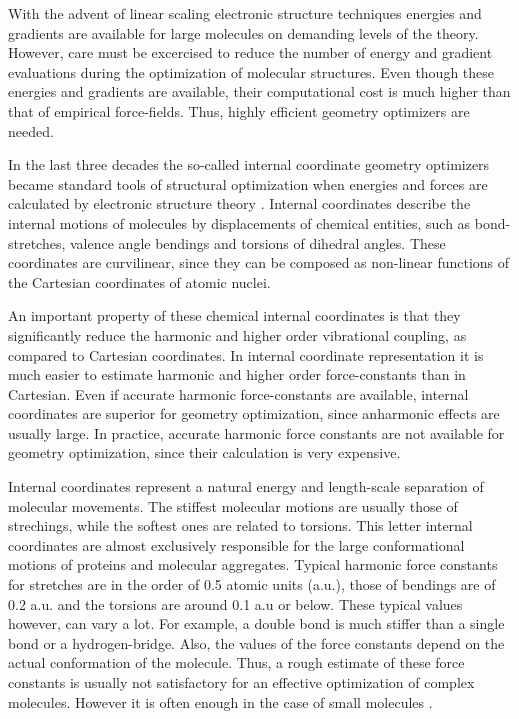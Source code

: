 \documentclass[prl,aps,twocolumn,showpacs,twocolumngrid,superbib]{revtex4}
\begin{document}
With the advent of linear scaling electronic structure techniques 
\cite{Goedecker99}
energies and gradients are available for large molecules on demanding
levels of the theory. 
However, care must be excercised to reduce the number of energy and 
gradient evaluations during the optimization of molecular structures.
Even though these energies and gradients are available, their 
computational cost is much higher than that of empirical force-fields.
Thus, highly efficient geometry optimizers are needed.

In the last three decades the so-called internal coordinate 
geometry optimizers 
became standard tools of structural optimization when energies 
and forces are calculated by electronic structure theory 
\cite{Pulay_natural_internals}.
Internal coordinates describe the internal motions of molecules 
by displacements of chemical entities, such as bond-stretches, 
valence angle bendings and torsions of dihedral angles. These 
coordinates are curvilinear, since they can be composed
as non-linear functions of the Cartesian coordinates of atomic nuclei.

An important property of these chemical
internal coordinates
is that they significantly reduce the harmonic and higher order 
vibrational coupling, as compared to Cartesian coordinates. 
In internal coordinate representation it is much easier to estimate 
harmonic and higher order force-constants than in Cartesian. Even
if accurate harmonic force-constants are available, internal coordinates
are superior for geometry optimization, since anharmonic effects are
usually large. In practice, accurate harmonic force constants are 
not available for geometry optimization, since their calculation 
is very expensive.

Internal coordinates represent a natural energy and 
length-scale separation of molecular movements.
The stiffest molecular motions are usually those of strechings, while 
the softest ones are related to torsions. This letter internal 
coordinates are almost exclusively responsible for the large 
conformational motions of proteins and molecular aggregates.
Typical harmonic force constants for stretches are in the order of 
0.5 atomic units (a.u.), those of bendings are of 0.2 a.u. and the
torsions are around 0.1 a.u or below. 
These typical values however, can vary a lot.
For example, a double bond is much stiffer than a single bond or 
a hydrogen-bridge. Also, the values of the force constants depend
on the actual conformation of the molecule. Thus, a rough estimate
of these force constants is usually not satisfactory 
for an effective optimization
of complex molecules. However it is often enough in the case of small
molecules \cite{fogarasi_diaghess}.
\end{document}
